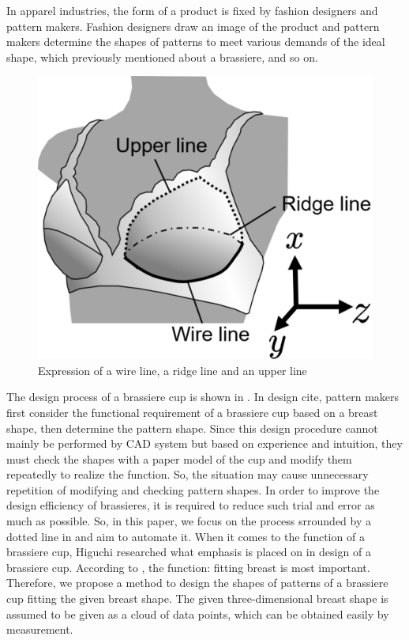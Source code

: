 \documentclass[E]{scitrans}
\begin{document}
In apparel industries, the form of a product is fixed by fashion designers and pattern makers. Fashion designers draw an image of the product and pattern makers determine the shapes of patterns to meet various demands of the ideal shape, which previously mentioned about a brassiere, and so on.
\begin{figure}[h!]
	\centering
	\includegraphics[scale=0.25]{./figure/Lines.eps}
	\caption{Expression of a wire line, a ridge line and an upper line}
	\label{fig:TwoCurves}
\end{figure}
The design process of a brassiere cup is shown in . In design cite, pattern makers first consider the functional requirement of a brassiere cup based on a breast shape, then determine the pattern shape. Since this design procedure cannot mainly be performed by CAD system but based on experience and intuition, they must check the shapes with a paper model of the cup and modify them repeatedly to realize the function. So, the situation may cause unnecessary repetition of modifying and checking pattern shapes. In order to improve the design efficiency of brassieres, it is required to reduce such trial and error as much as possible. So, in this paper, we focus on the process srrounded by a dotted line in  and aim to automate it. 
When it comes to the function of a brassiere cup, Higuchi researched what emphasis is placed on in design of a brassiere cup\cite{c1}. According to  \cite{c1}, the function: fitting breast is most important. Therefore, we propose a method to design the shapes of patterns of a brassiere cup fitting the given breast shape. The given three-dimensional breast shape is assumed to be given as a cloud of data points, which can be obtained easily by measurement.
\end{document}
